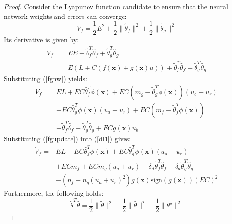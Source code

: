 \documentclass[preprint,12pt]{elsarticle}
\begin{document}
\begin{proof}
    Consider the Lyapunov function candidate to ensure that the neural network weights and errors can converge:
\begin{equation}
    V_f = \frac{1}{2}E^2 + \frac{1}{2} \|\tilde{\theta}_f\|^2 + \frac{1}{2} \|\tilde{\theta}_g\|^2
\end{equation}
Its derivative is given by:
\begin{equation}
    \begin{aligned}
    \dot{V}_f = & E\dot{E} + \tilde{\theta}^{T}_f \dot{\hat{\theta}}_f + \tilde{\theta}^{T}_g \dot{\hat{\theta}}_g \\
            = &  E(L + C(f(\mathbf{x})+g(\mathbf{x})u)) + \tilde{\theta}^{T}_f \dot{\hat{\theta}}_f + \tilde{\theta}^{T}_g \dot{\hat{\theta}}_g  
    \end{aligned}
\end{equation}
Substituting (\ref*{fgnw}) yields:
\begin{equation}
    \begin{aligned}
    \dot{V}_f = &  EL + EC \hat{\theta}^{T}_f \phi(\mathbf{x}) + EC (m_g - \tilde{\theta}^{T}_g \phi(\mathbf{x}))(u_a + u_r)\\ 
              & + EC \hat{\theta}^{T}_g \phi(\mathbf{x})(u_a + u_r)+ EC (m_f - \tilde{\theta}^{T}_f \phi(\mathbf{x}))  \\
              & + \tilde{\theta}^{T}_f \dot{\hat{\theta}}_f + \tilde{\theta}^{T}_g \dot{\hat{\theta}}_g + ECg(\mathbf{x})u_b \label{dl1}
    \end{aligned}
\end{equation}
Substituting (\ref{fgupdate}) into (\ref*{dl1}) gives:
\begin{equation}
    \begin{aligned}
    \dot{V}_f = &  EL + EC \hat{\theta}^{T}_f \phi(\mathbf{x}) + EC \hat{\theta}^{T}_g \phi(\mathbf{x})(u_a + u_r)  \\ 
             & + EC m_f + EC m_g(u_a + u_r) - \delta_d \tilde{\theta}^{T}_f \hat{\theta}_f - \delta_d \tilde{\theta}^{T}_g \hat{\theta}_g  \\
             & -(n_f+n_g(u_a + u_r)^2)g(\mathbf{x})\mathrm{sign}(g(\mathbf{x})) (EC)^2\label{dV2} 
    \end{aligned}
\end{equation}
Furthermore, the following holds:
\begin{equation}
    \tilde{\theta}^T\hat{\theta}=\frac{1}{2}\|\tilde{\theta}\|^2+\frac{1}{2}\|\hat{\theta}\|^2-\frac{1}{2}\|\theta^\star\|^2\label{thetne}

\end{equation}
\end{proof}
\end{document}
